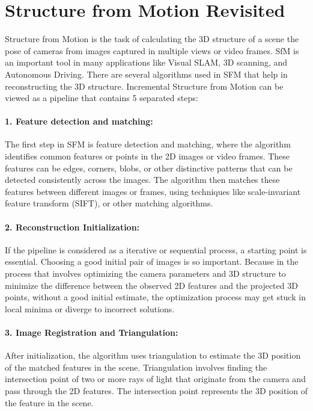 \documentclass[11pt]{article}
\begin{document}
    \section{Structure from Motion Revisited}
    Structure from Motion is the task of calculating the 3D structure of a scene the pose of cameras from
    images captured in multiple views or video frames. SfM is an important tool in many applications like
    Visual SLAM, 3D scanning, and Autonomous Driving. There are several algorithms used in SFM that help
    in reconstructing the 3D structure.
    Incremental Structure from Motion can be viewed as a pipeline that contains 5 separated steps:

    \paragraph{1. Feature detection and matching:} The first step in SFM is feature detection and matching, where
    the algorithm identifies common features or points in the 2D images or video frames. These features
    can be edges, corners, blobs, or other distinctive patterns that can be detected consistently across
    the images. The algorithm then matches these features between different images or frames, using techniques
    like scale-invariant feature transform (SIFT), or other matching algorithms.

    \paragraph{2. Reconstruction Initialization:} If the pipeline is considered as a iterative or sequential process,
    a starting point is essential. Choosing a good initial pair of images is so important. Because in the
    process that involves optimizing the camera parameters and 3D structure to minimize the difference between
    the observed 2D features and the projected 3D points, without a good initial estimate, the optimization
    process may get stuck in local minima or diverge to incorrect solutions.

    \paragraph{3. Image Registration and Triangulation:} After initialization, the algorithm uses triangulation to estimate
    the 3D position of the matched features in the scene. Triangulation involves finding the intersection point
    of two or more rays of light that originate from the camera and pass through the 2D features. The intersection
    point represents the 3D position of the feature in the scene.
\end{document}
